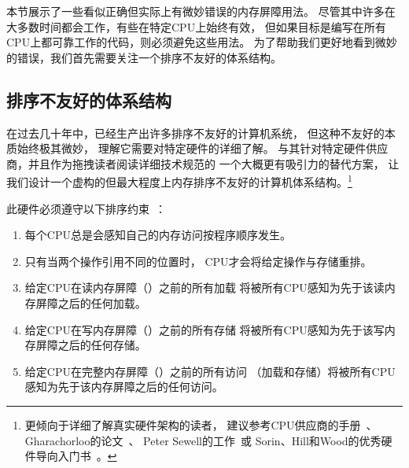 本节展示了一些看似正确但实际上有微妙错误的内存屏障用法。
尽管其中许多在大多数时间都会工作，有些在特定CPU上始终有效，
但如果目标是编写在所有CPU上都可靠工作的代码，则必须避免这些用法。
为了帮助我们更好地看到微妙的错误，我们首先需要关注一个排序不友好的体系结构。

\subsection{排序不友好的体系结构}
\label{sec:app:whymb:Ordering-Hostile Architecture}

在过去几十年中，已经生产出许多排序不友好的计算机系统，
但这种不友好的本质始终极其微妙，
理解它需要对特定硬件的详细了解。
与其针对特定硬件供应商，并且作为拖拽读者阅读详细技术规范的
一个大概更有吸引力的替代方案，
让我们设计一个虚构的但最大程度上内存排序不友好的计算机体系结构。\footnote{
	更倾向于详细了解真实硬件架构的读者，
	建议参考CPU供应商的手册~\cite{ALPHA95,AMDOpteron02,IntelItanium02v2,PowerPC94,MichaelLyons05a,SPARC94,IntelXeonV3-96a,IntelXeonV2b-96a,IBMzSeries04a}、
	Gharachorloo的论文~\cite{Gharachorloo95}、
	Peter Sewell的工作~\cite{PeterSewell2021weakmemory}或
	Sorin、Hill和Wood的优秀硬件导向入门书~\cite{DanielJSorin2011MemModel}。}

此硬件必须遵守以下排序约束~\cite{PaulMcKenney2005i,PaulMcKenney2005j}：
\begin{enumerate}
\item	每个CPU总是会感知自己的内存访问按程序顺序发生。
\item	只有当两个操作引用不同的位置时，
	CPU才会将给定操作与存储重排。
\item	给定CPU在读内存屏障（）之前的所有加载
	将被所有CPU感知为先于该读内存屏障之后的任何加载。
\item	给定CPU在写内存屏障（）之前的所有存储
	将被所有CPU感知为先于该写内存屏障之后的任何存储。
\item	给定CPU在完整内存屏障（）之前的所有访问
	（加载和存储）将被所有CPU感知为先于该内存屏障之后的任何访问。
\end{enumerate}

\QuickQuizEnd

